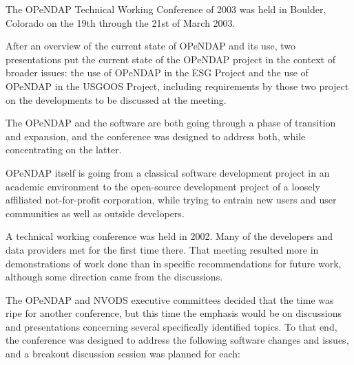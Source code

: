 The \ac{OPeNDAP} Technical Working Conference of 2003 was held in Boulder,
Colorado on the 19th through the 21st of March 2003.  

After an overview of the current state of \ac{OPeNDAP} and its use,
two presentations put the current state of the \ac{OPeNDAP}
project in the context of broader issues: the use of \ac{OPeNDAP} in
the \ac{ESG} Project and the use of \ac{OPeNDAP} in the \ac{USGOOS}
Project, including requirements by those two project on the developments
to be discussed at the meeting.

The \ac{OPeNDAP} and the software are both going through a phase of
transition and expansion, and the conference was designed to address
both, while concentrating on the latter.  

\ac{OPeNDAP} itself is going from a classical software development
project in an academic environment to the open-source development project
of a loosely affiliated not-for-profit corporation, while trying to 
entrain new users and user communities as well as outside developers.  

A technical working conference was held in 2002.  Many of the 
developers and data providers met for the first time there.  That meeting
resulted more in demonstrations of work done than in specific
recommendations for future work, although some direction came
from the discussions.

The \ac{OPeNDAP} and \ac{NVODS} executive committees decided that
the time was ripe for another conference, but this time the
emphasis would be on discussions and presentations concerning several
specifically identified topics.  To that end, the conference was
designed to address the following software changes and issues, and
a breakout discussion session was planned for each:

